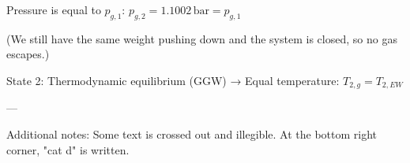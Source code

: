 Pressure is equal to \( p_{g,1} \):  
\( p_{g,2} = 1.1002 \, \text{bar} = p_{g,1} \)  

(We still have the same weight pushing down and the system is closed, so no gas escapes.)  

State 2: Thermodynamic equilibrium (GGW) → Equal temperature:  
\( T_{2,g} = T_{2,EW} \)  

---

Additional notes:  
Some text is crossed out and illegible.  
At the bottom right corner, "cat d" is written.